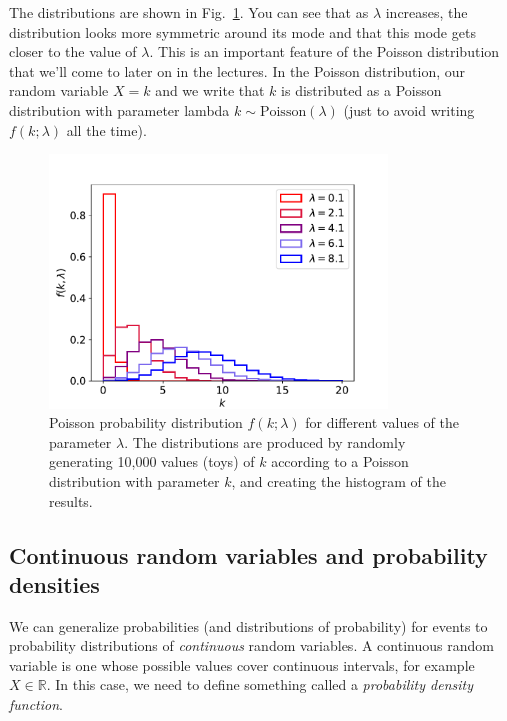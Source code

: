 The distributions are shown in Fig.~\ref{fig:poissondistributions}. You can see that as $\lambda$ increases, the distribution looks more symmetric around its mode and that this mode gets closer to the value of $\lambda$. This is an important feature of the Poisson distribution that we'll come to later on in the lectures. In the Poisson distribution, our random variable $X=k$ and we write that $k$ is distributed as a Poisson distribution with parameter lambda $k\sim \mathrm{Poisson}(\lambda)$ (just to avoid writing $f(k;\lambda)$ all the time). 

\begin{figure}[hbt!]
    \centering
    \includegraphics[width=0.8\textwidth]{figures/Probability/PoissonProbs.pdf}
    \caption{Poisson probability distribution $f(k;\lambda)$ for different values of the parameter $\lambda$. The distributions are produced by randomly generating 10,000 values (toys) of $k$ according to a Poisson distribution with parameter $k$, and creating the histogram of the results.}
    \label{fig:poissondistributions}
\end{figure}

\subsection{Continuous random variables and probability densities}

We can generalize probabilities (and distributions of probability) for events to probability distributions of \emph{continuous} random variables. A continuous random variable  is one whose possible values cover continuous intervals, for example $X\in\mathbb{R}$. In this case, we need to define something called a \emph{probability density function}. 

